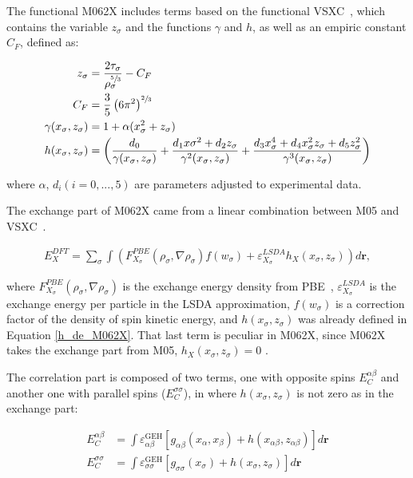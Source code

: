The functional M062X includes terms based on the functional
VSXC~\cite{VanVoorhis1998}, which contains the variable  $z_\sigma$ and the
functions $\gamma$ and $h$, as well as an empiric constant $C_F$, defined as:

\begin{align}
  \begin{split}
    z_\sigma &= \frac{2\tau_\sigma}{\rho_\sigma^{\sfrac53}} - C_F\\
    C_F &= \frac35 \left( 6\pi^2 \right)^{\sfrac23}\\
    \gamma(x_\sigma, z_\sigma ) &= 1 +\alpha (x_\sigma^2 +z_\sigma)\\
    h(x_\sigma, z_\sigma ) &=
    \left( \frac{d_0}{\gamma(x_\sigma, z_\sigma )} + \frac{d_1x\sigma^2 + d_2z_\sigma}{\gamma^2(x_\sigma, z_\sigma )} + \frac{d_3x_\sigma^4 + d_4x_\sigma^2z_\sigma + d_5z_\sigma^2}{\gamma^3(x_\sigma, z_\sigma )} \right) 
  \end{split}
\label{h_de_M062X}
\end{align}

\noindent where $\alpha$, $d_i (i=0,...,5)$ are parameters adjusted to
experimental data.

The exchange part of M062X came from a linear combination between M05 and
VSXC~\cite{Zhao2007}.

\begin{align}
  E_X^{DFT} = \sum_\sigma \int
  \left( F_{X_\sigma}^{PBE}(\rho_\sigma,\nabla\rho_\sigma) f(w_\sigma) + \varepsilon_{X_\sigma}^{LSDA}h_X (x_\sigma, z_\sigma) \right) d\mathbf{r},
\end{align}

\noindent where $F_{X_\sigma}^{PBE}(\rho_\sigma,\nabla\rho_\sigma)$ is the
exchange energy density from PBE~\cite{Zhao2007},
$\varepsilon_{X_\sigma}^{LSDA}$ is the exchange energy per particle in the
\gls{LSDA} approximation, $f(w_\sigma)$ is a correction factor of the density
of spin kinetic energy, and $h (x_\sigma, z_\sigma)$ was already defined in
Equation \ref{h_de_M062X}.  That last term is peculiar in M062X, since M062X
takes the exchange part from M05, $h_X (x_\sigma, z_\sigma) = 0$
\cite{Zhao2007,Zhao2005}.

The correlation part is composed of two terms, one with opposite spins
$E_C^{\alpha\beta}$ and another one with parallel spins ($E_C^{\sigma\sigma}$),
in where $h (x_\sigma, z_\sigma)$ is not zero as in the exchange part:

\begin{align}
  E_C^{\alpha\beta} &= \int\varepsilon^{\mathrm{GEH}}_{\alpha\beta}
  \left[ g_{\alpha\beta} (x_\alpha, x_\beta) + h(x_{\alpha\beta},z_{\alpha\beta})\right]
  d\mathbf{r}\\
  E_C^{\sigma\sigma} &= \int\varepsilon^{\mathrm{GEH}}_{\sigma\sigma}
  \left[ g_{\sigma\sigma} (x_\sigma) + h(x_{\sigma},z_{\sigma})\right]
  d\mathbf{r}
\label{Ecalpha}
\end{align}

